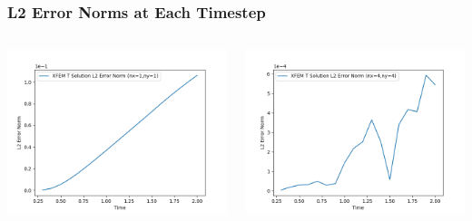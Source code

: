 \documentclass[]{beamer}
\begin{document}
\begin{frame}[t]\frametitle{L2 Error Norms at Each Timestep}
  	\begin{columns}
			\begin{center}
			\includegraphics[scale=0.4]{figures/2D_xy_ls1m/2D_xy_ls1mat_nx1ny1_L2_Errs}
			\end{center}
			\begin{center}
			\includegraphics[scale=0.4]{figures/2D_xy_ls1m/2D_xy_ls1mat_nx4ny4_L2_Errs}
			\end{center}
	\end{columns}
\end{frame}
\end{document}
